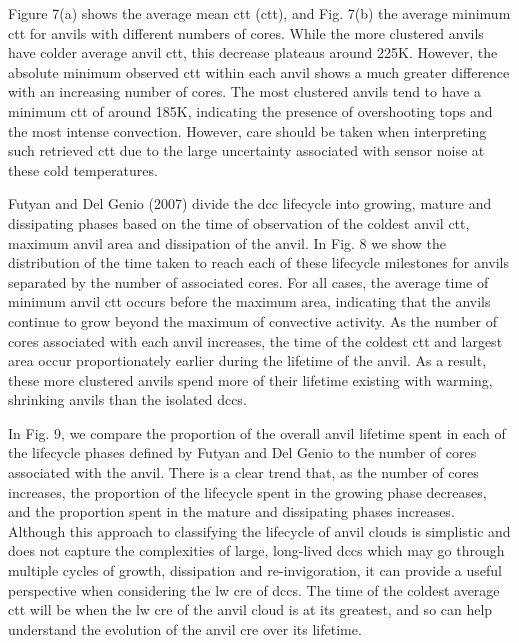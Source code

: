 Figure 7(a) shows the average mean \acrshort{ctt} (\acrshort{ctt}), and Fig.
7(b) the average minimum \acrshort{ctt} for anvils with different numbers of cores.
While the more clustered anvils have colder average anvil \acrshort{ctt}, this
decrease plateaus around 225K. However, the absolute minimum observed
\acrshort{ctt} within each anvil shows a much greater difference with an increasing
number of cores. The most clustered anvils tend to have a minimum \acrshort{ctt} of
around 185K, indicating the presence of overshooting tops and the most
intense convection. However, care should be taken when interpreting such
retrieved \acrshort{ctt} due to the large uncertainty associated with sensor noise
at these cold temperatures.

Futyan and Del Genio (2007) divide the \acrshort{dcc} lifecycle into growing,
mature and dissipating phases based on the time of observation of the
coldest anvil \acrshort{ctt}, maximum anvil area and dissipation of the anvil. In
Fig. 8 we show the distribution of the time taken to reach each of these
lifecycle milestones for anvils separated by the number of associated
cores. For all cases, the average time of minimum anvil \acrshort{ctt} occurs
before the maximum area, indicating that the anvils continue to grow
beyond the maximum of convective activity. As the number of cores
associated with each anvil increases, the time of the coldest \acrshort{ctt} and
largest area occur proportionately earlier during the lifetime of the
anvil. As a result, these more clustered anvils spend more of their
lifetime existing with warming, shrinking anvils than the isolated \acrshort{dcc}s.

In Fig. 9, we compare the proportion of the overall anvil lifetime spent
in each of the lifecycle phases defined by Futyan and Del Genio to the
number of cores associated with the anvil. There is a clear trend that,
as the number of cores increases, the proportion of the lifecycle spent
in the growing phase decreases, and the proportion spent in the mature
and dissipating phases increases. Although this approach to classifying
the lifecycle of anvil clouds is simplistic and does not capture the
complexities of large, long-lived \acrshort{dcc}s which may go through multiple
cycles of growth, dissipation and re-invigoration, it can provide a
useful perspective when considering the \acrshort{lw} \acrshort{cre} of \acrshort{dcc}s. The time of the
coldest average \acrshort{ctt} will be when the \acrshort{lw} \acrshort{cre} of the anvil cloud is at its
greatest, and so can help understand the evolution of the anvil \acrshort{cre} over
its lifetime.

